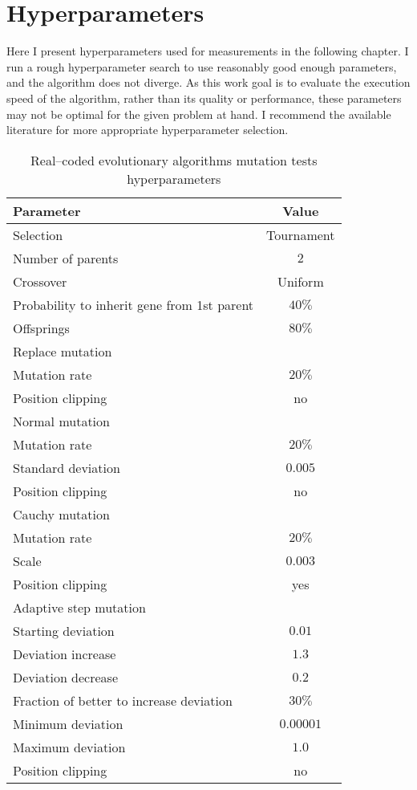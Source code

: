 \chapter{Hyperparameters}
\label{chap:hyperparameters}

Here I present hyperparameters used for measurements in the following chapter. I run a rough hyperparameter search to use reasonably good enough parameters, and the algorithm does not diverge. As this work goal is to evaluate the execution speed of the algorithm, rather than its quality or performance, these parameters may not be optimal for the given problem at hand. I recommend the available literature for more appropriate hyperparameter selection. 


\begin{table}[h]
    \centering
    \begin{tabular}{|l|c|}
        \hline
        \textbf{Parameter} & \textbf{Value} \\
        \hline
        Selection & Tournament \\
        \quad Number of parents & $2$ \\
        Crossover & Uniform \\
        \quad Probability to inherit gene from 1st parent & $40\%$ \\
        \quad Offsprings & $80\%$ \\
        \hline
        Replace mutation & \\
        \quad Mutation rate & $20\%$ \\
        \quad Position clipping & no \\
        Normal mutation & \\
        \quad Mutation rate & $20\%$ \\
        \quad Standard deviation & $0.005$ \\
        \quad Position clipping & no \\
        Cauchy mutation & \\
        \quad Mutation rate & $20\%$ \\
        \quad Scale & $0.003$ \\
        \quad Position clipping & yes \\
        Adaptive step mutation & \\
        \quad Starting deviation & $0.01$ \\
        \quad Deviation increase & $1.3$ \\
        \quad Deviation decrease & $0.2$ \\
        \quad Fraction of better to increase deviation & $30\%$ \\
        \quad Minimum deviation & $0.00001$ \\
        \quad Maximum deviation & $1.0$ \\
        \quad Position clipping & no \\
        \hline
    \end{tabular}
    \caption{Real--coded evolutionary algorithms mutation tests hyperparameters}
    \label{tab:esmutationhyperparmarameters}
\end{table}


